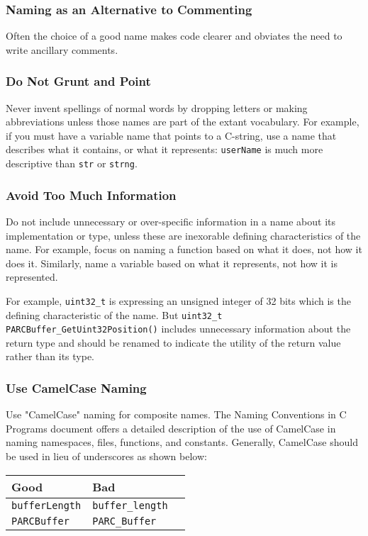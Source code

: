 \documentclass[fleqn,12pt]{PARCOneColumn} %
\begin{document}
\subsubsection{Naming as an Alternative to Commenting}
Often the choice of a good name makes code clearer and obviates the need to write ancillary comments.

\subsubsection{Do Not Grunt and Point}
Never invent spellings of normal words by dropping letters or making abbreviations unless those names are part of the extant vocabulary. For example, if you must have a variable name that points to a C-string,
use a name that describes what it contains, or what it represents:
{\tt userName} is much more descriptive than {\tt str} or {\tt strng}.

\subsubsection{Avoid Too Much Information}
Do not include unnecessary or over-specific information in a name about its implementation or type,
unless these are inexorable defining characteristics of the name.
For example, focus on naming a function based on what it does, not how it does it.
Similarly, name a variable based on what it represents, not how it is represented.

For example, {\tt uint32\_t} is expressing an unsigned integer of 32 bits
which is the defining characteristic of the name.
But {\tt uint32\_t PARCBuffer\_GetUint32Position()} includes unnecessary information about the return type
and should be renamed to indicate the utility of the return value rather than its type.

\subsubsection{Use CamelCase Naming}
Use "CamelCase" naming for composite names. The Naming Conventions in C Programs document offers a detailed description of the use of CamelCase in naming namespaces, files, functions, and constants. Generally, CamelCase should be used in lieu of underscores as shown below:

\begin{tabular}{llr}
\toprule
Good & Bad \\
\midrule
{\tt bufferLength} & {\tt buffer\_length} \\
{\tt PARCBuffer} & {\tt PARC\_Buffer} \\
\bottomrule
\end{tabular}
\end{document}
